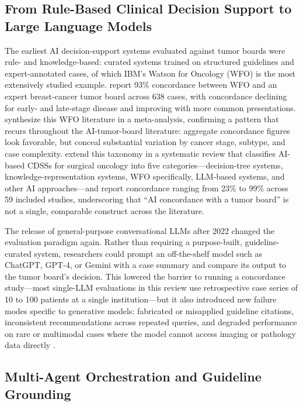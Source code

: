 \documentclass[acmsmall,screen=true,review=false,nonacm=true]{acmart}
\begin{document}
\subsection{From Rule-Based Clinical Decision Support to Large Language Models}
\label{sec:rule-to-llm}

The earliest AI decision-support systems evaluated against tumor boards were rule- and knowledge-based: curated systems trained on structured guidelines and expert-annotated cases, of which IBM's Watson for Oncology (WFO) is the most extensively studied example. \citet{somashekhar2018} report 93\% concordance between WFO and an expert breast-cancer tumor board across 638 cases, with concordance declining for early- and late-stage disease and improving with more common presentations. \citet{jie2021} synthesize this WFO literature in a meta-analysis, confirming a pattern that recurs throughout the AI-tumor-board literature: aggregate concordance figures look favorable, but conceal substantial variation by cancer stage, subtype, and case complexity. \citet{wu2026} extend this taxonomy in a systematic review that classifies AI-based CDSSs for surgical oncology into five categories---decision-tree systems, knowledge-representation systems, WFO specifically, LLM-based systems, and other AI approaches---and report concordance ranging from 23\% to 99\% across 59 included studies, underscoring that ``AI concordance with a tumor board'' is not a single, comparable construct across the literature.

The release of general-purpose conversational LLMs after 2022 changed the evaluation paradigm again. Rather than requiring a purpose-built, guideline-curated system, researchers could prompt an off-the-shelf model such as ChatGPT, GPT-4, or Gemini with a case summary and compare its output to the tumor board's decision. This lowered the barrier to running a concordance study---most single-LLM evaluations in this review use retrospective case series of 10 to 100 patients at a single institution---but it also introduced new failure modes specific to generative models: fabricated or misapplied guideline citations, inconsistent recommendations across repeated queries, and degraded performance on rare or multimodal cases where the model cannot access imaging or pathology data directly \citep{chatziisaak2025,ciulli2026,dogan2025}.

\subsection{Multi-Agent Orchestration and Guideline Grounding}
\label{sec:multiagent-background}
\end{document}
